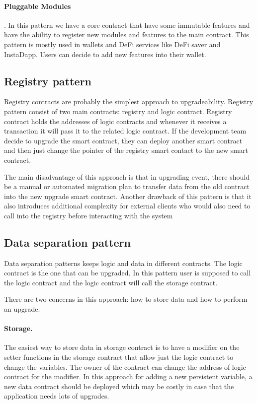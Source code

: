 \paragraph{Pluggable Modules}. In this pattern we have a core contract that have some immutable features and have the ability to register new modules and features to the main contract. This pattern is mostly used in wallets and DeFi services like DeFi saver and InstaDapp. Users can decide to add new features into their wallet. 

\subsection{Registry pattern}
Registry contracts are probably the simplest approach to upgradeability. Registry pattern consist of two main contracts: registry and logic contract. Registry contract holds the addresses of logic contracts and whenever it receives a transaction it will pass it to the related logic contract. 
If the development team decide to upgrade the smart contract, they can deploy another smart contract and then just change the pointer of the registry smart contact to the new smart contract.

The main disadvantage of this approach is that in upgrading event, there should be a manual or automated migration plan to transfer data from the old contract into the new upgrade smart contract.
Another drawback of this pattern is that it also introduces additional complexity for external clients who would also need to call into the registry before interacting with the system

\subsection{Data separation pattern}
Data separation patterns keeps logic and data in different contracts. The logic contract is the one that can be upgraded. In this pattern user is supposed to call the logic contract and the logic contract will call the storage contract.

There are two concerns in this approach: how to store data and how to perform an upgrade.

\paragraph{Storage. }The easiest way to store data in storage contract is to have a modifier on the setter functions in the storage contract that allow just the logic contract to change the variables. The owner of the contract can change the address of logic contract for the modifier.
In this approach for adding a new persistent variable, a new data contract should be deployed which may be costly in case that the application needs lots of upgrades.

